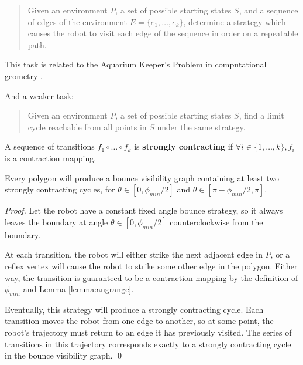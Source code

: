 \documentclass[]{styles/svproc}  %
\begin{document}
\begin{quotation}
Given an environment $P$, a set of possible starting states $S$, and
a sequence of edges of the environment $E = \{e_1, \ldots, e_k\}$,
determine a strategy which causes the robot to visit each edge of the sequence
in order on a repeatable path.
\end{quotation}

This task is related to the Aquarium Keeper's Problem in computational
geometry \cite{czyzowicz1991aquarium}.

And a weaker task:

\begin{quotation}
Given an environment $P$, a set of possible starting states $S$, find a limit
cycle reachable from all points in $S$ under the same strategy.
\end{quotation}


\begin{definition}
A sequence of transitions $f_1 \circ \ldots \circ f_k$ is \textbf{strongly
contracting} if $\forall i \in \{1, \ldots, k\}, f_i$ is a contraction mapping.
\end{definition}

\begin{corollary}
Every polygon will produce a bounce visibility graph containing at least two
strongly contracting cycles, for $\theta \in [0, \phi_{min}/2]$ and $\theta \in
[\pi - \phi_{min}/2, \pi]$.
\end{corollary}

\begin{proof}

Let the robot have a constant fixed angle bounce strategy, so it always leaves
the boundary at angle $\theta \in [0,\phi_{min}/2]$ counterclockwise from the
boundary.

At each transition, the robot will either strike the next adjacent edge in
$P$, or a reflex vertex will cause the robot to strike some other edge in the
polygon. Either way, the transition is guaranteed to be a contraction mapping by
the definition of $\phi_{min}$ and Lemma \ref{lemma:angrange}.

Eventually, this strategy will produce a strongly contracting cycle. Each
transition moves the robot from one edge to another, so at some point, the
robot's trajectory must return to an edge it has previously visited. The series
of transitions in this trajectory corresponds exactly to a strongly contracting
cycle in the bounce visibility graph.
\qed

\end{proof}
\end{document}
